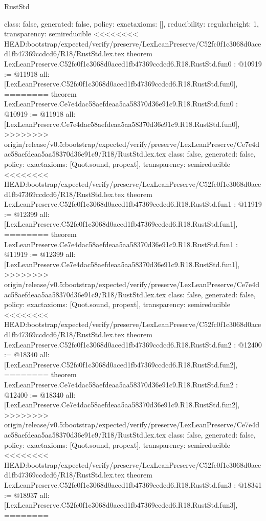 \begin{lexlean}{RustStd}
\begin{coremodule}
{\begin{coremodule}
{{{  class: false,
  generated: false,
  policy: exact{axioms: []},
  reducibility: regular{height: 1},
  transparency: semireducible
}
<<<<<<<< HEAD:bootstrap/expected/verify/preserve/LexLeanPreserve/C52fc0f1c3068d0aced1fb47369ccdcd6/R18/RustStd.lex.tex
theorem LexLeanPreserve.C52fc0f1c3068d0aced1fb47369ccdcd6.R18.RustStd.fun0 : @10919 := @11918 {
  all: [LexLeanPreserve.C52fc0f1c3068d0aced1fb47369ccdcd6.R18.RustStd.fun0],
========
theorem LexLeanPreserve.Ce7e4dac58aefdeaa5aa58370d36e91c9.R18.RustStd.fun0 : @10919 := @11918 {
  all: [LexLeanPreserve.Ce7e4dac58aefdeaa5aa58370d36e91c9.R18.RustStd.fun0],
>>>>>>>> origin/release/v0.5:bootstrap/expected/verify/preserve/LexLeanPreserve/Ce7e4dac58aefdeaa5aa58370d36e91c9/R18/RustStd.lex.tex
  class: false,
  generated: false,
  policy: exact{axioms: [Quot.sound, propext]},
  transparency: semireducible
}
<<<<<<<< HEAD:bootstrap/expected/verify/preserve/LexLeanPreserve/C52fc0f1c3068d0aced1fb47369ccdcd6/R18/RustStd.lex.tex
theorem LexLeanPreserve.C52fc0f1c3068d0aced1fb47369ccdcd6.R18.RustStd.fun1 : @11919 := @12399 {
  all: [LexLeanPreserve.C52fc0f1c3068d0aced1fb47369ccdcd6.R18.RustStd.fun1],
========
theorem LexLeanPreserve.Ce7e4dac58aefdeaa5aa58370d36e91c9.R18.RustStd.fun1 : @11919 := @12399 {
  all: [LexLeanPreserve.Ce7e4dac58aefdeaa5aa58370d36e91c9.R18.RustStd.fun1],
>>>>>>>> origin/release/v0.5:bootstrap/expected/verify/preserve/LexLeanPreserve/Ce7e4dac58aefdeaa5aa58370d36e91c9/R18/RustStd.lex.tex
  class: false,
  generated: false,
  policy: exact{axioms: [Quot.sound, propext]},
  transparency: semireducible
}
<<<<<<<< HEAD:bootstrap/expected/verify/preserve/LexLeanPreserve/C52fc0f1c3068d0aced1fb47369ccdcd6/R18/RustStd.lex.tex
theorem LexLeanPreserve.C52fc0f1c3068d0aced1fb47369ccdcd6.R18.RustStd.fun2 : @12400 := @18340 {
  all: [LexLeanPreserve.C52fc0f1c3068d0aced1fb47369ccdcd6.R18.RustStd.fun2],
========
theorem LexLeanPreserve.Ce7e4dac58aefdeaa5aa58370d36e91c9.R18.RustStd.fun2 : @12400 := @18340 {
  all: [LexLeanPreserve.Ce7e4dac58aefdeaa5aa58370d36e91c9.R18.RustStd.fun2],
>>>>>>>> origin/release/v0.5:bootstrap/expected/verify/preserve/LexLeanPreserve/Ce7e4dac58aefdeaa5aa58370d36e91c9/R18/RustStd.lex.tex
  class: false,
  generated: false,
  policy: exact{axioms: [Quot.sound, propext]},
  transparency: semireducible
}
<<<<<<<< HEAD:bootstrap/expected/verify/preserve/LexLeanPreserve/C52fc0f1c3068d0aced1fb47369ccdcd6/R18/RustStd.lex.tex
theorem LexLeanPreserve.C52fc0f1c3068d0aced1fb47369ccdcd6.R18.RustStd.fun3 : @18341 := @18937 {
  all: [LexLeanPreserve.C52fc0f1c3068d0aced1fb47369ccdcd6.R18.RustStd.fun3],
========
}}}}}}
\end{coremodule}}
\end{coremodule}
\end{lexlean}
